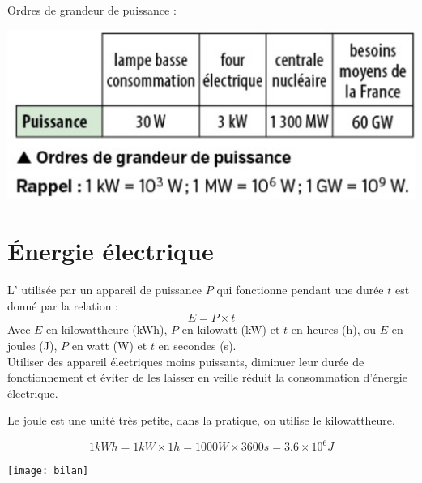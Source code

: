 \documentclass[12pt,a4paper]{article}
\begin{document}
\begin{myex}
	Ordres de grandeur de puissance :
	\begin{center}
		\includegraphics[scale=0.4]{ordre}
	\end{center}
\end{myex}

\section{\'Energie électrique}

\begin{mybilan}

	L' utilisée par un appareil de puissance $P$ qui fonctionne pendant une durée $t$ est donné par la relation :
	\begin{equation*}
		E = P \times t
	\end{equation*}
	Avec $E$ en kilowattheure (kWh), $P$ en kilowatt (kW) et $t$ en heures (h), ou  $E$ en joules (J), $P$ en watt (W) et $t$ en secondes (s).\\

	Utiliser des appareil électriques moins puissants, diminuer leur durée de fonctionnement et éviter de les laisser en veille réduit la consommation d'énergie électrique.
 
\end{mybilan}

\begin{myrem}
	Le joule est une unité très petite, dans la pratique, on utilise le kilowattheure.

	\begin{equation*}
		1 kWh = 1 kW \times 1h = 1000 W \times 3600 s = \num{3.6} \times 10^{6} J
	\end{equation*}
\end{myrem}


\begin{center}
	\texttt{[image: bilan]}
\end{center}
\end{document}
